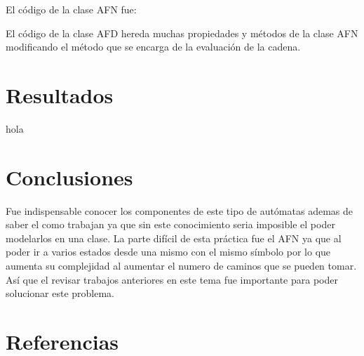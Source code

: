 \documentclass[16pt, titlepage]{article}
\begin{document}
	El código de la clase AFN fue:
	
	El código de la clase AFD hereda muchas propiedades y métodos de la clase AFN modificando el método que se encarga de la evaluación de la cadena.
	\section{Resultados}
	hola
	\section{Conclusiones}
	Fue indispensable conocer los componentes de este tipo de autómatas ademas de saber el como trabajan 
	ya que sin este conocimiento seria imposible el poder modelarlos en una clase. La parte difícil de esta 
	práctica fue el AFN ya que al poder ir a varios estados desde una mismo con el mismo símbolo por lo que 
	aumenta su complejidad al aumentar el numero de caminos que se pueden tomar. 
	Así que el revisar trabajos anteriores en este tema fue importante para poder solucionar este problema.
	\section{Referencias}
\end{document}
